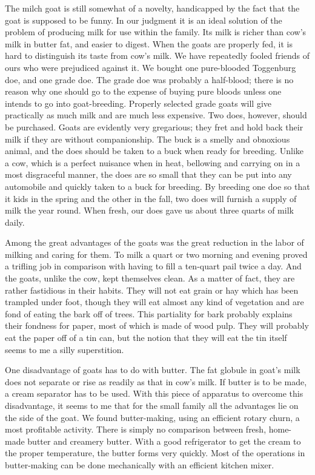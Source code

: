\documentclass{book}
\begin{document}
The milch goat is still somewhat of a novelty, handicapped by the fact that the goat is supposed to be funny. In our judgment it is an ideal solution of the problem of producing milk for use within the family. Its milk is richer than cow’s milk in butter fat, and easier to digest. When the goats are properly fed, it is hard to distinguish its taste from cow’s milk. We have repeatedly fooled friends of ours who were prejudiced against it. We bought one pure-blooded Toggenburg doe, and one grade doe. The grade doe was probably a half-blood; there is no reason why one should go to the expense of buying pure bloods unless one intends to go into goat-breeding. Properly selected grade goats will give practically as much milk and are much less expensive. Two does, however, should be purchased. Goats are evidently very gregarious; they fret and hold back their milk if they are without companionship. The buck is a smelly and obnoxious animal, and the does should be taken to a buck when ready for breeding. Unlike a cow, which is a perfect nuisance when in heat, bellowing and carrying on in a most disgraceful manner, the does are so small that they can be put into any automobile and quickly taken to a buck for breeding. By breeding one doe so that it kids in the spring and the other in the fall, two does will furnish a supply of milk the year round. When fresh, our does gave us about three quarts of milk daily.

Among the great advantages of the goats was the great reduction in the labor of milking and caring for them. To milk a quart or two morning and evening proved a trifling job in comparison with having to fill a ten-quart pail twice a day. And the goats, unlike the cow, kept themselves clean. As a matter of fact, they are rather fastidious in their habits. They will not eat grain or hay which has been trampled under foot, though they will eat almost any kind of vegetation and are fond of eating the bark off of trees. This partiality for bark probably explains their fondness for paper, most of which is made of wood pulp. They will probably eat the paper off of a tin can, but the notion that they will eat the tin itself seems to me a silly superstition.

One disadvantage of goats has to do with butter. The fat globule in goat’s milk does not separate or rise as readily as that in cow’s milk. If butter is to be made, a cream separator has to be used. With this piece of apparatus to overcome this disadvantage, it seems to me that for the small family all the advantages lie on the side of the goat. We found butter-making, using an efficient rotary churn, a most profitable activity. There is simply no comparison between fresh, home-made butter and creamery butter. With a good refrigerator to get the cream to the proper temperature, the butter forms very quickly. Most of the operations in butter-making can be done mechanically with an efficient kitchen mixer.
\end{document}
